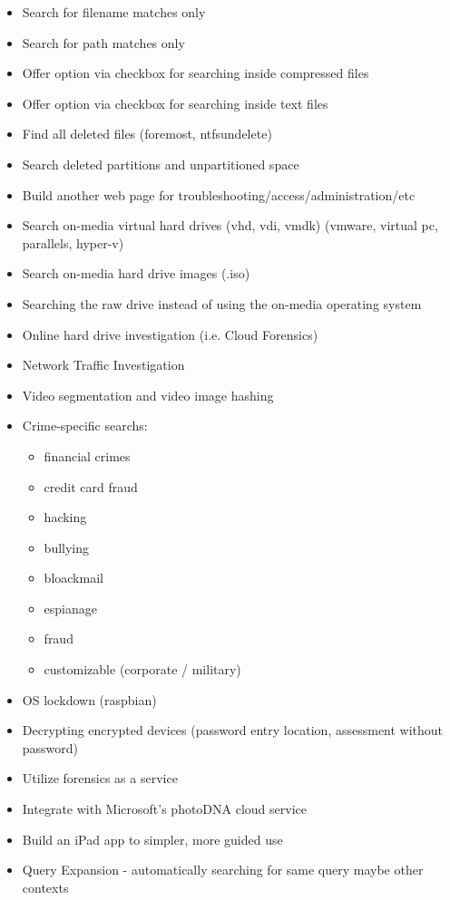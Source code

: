 \documentclass[12pt]{article}
\begin{document}
\begin{itemize}
  \item Search for filename matches only
  \item Search for path matches only
  \item Offer option via checkbox for searching inside compressed files
  \item Offer option via checkbox for searching inside text files
  \item Find all deleted files (foremost, ntfsundelete)
  \item Search deleted partitions and unpartitioned space
  \item Build another web page for troubleshooting/access/administration/etc
  \item Search on-media virtual hard drives (vhd, vdi, vmdk) (vmware, virtual pc, parallels, hyper-v)
  \item Search on-media hard drive images (.iso)
  \item Searching the raw drive instead of using the on-media operating system
  \item Online hard drive investigation (i.e. Cloud Forensics)
  \item Network Traffic Investigation
  \item Video segmentation and video image hashing
  \item Crime-specific searchs:
  \begin{itemize}
    \item financial crimes
    \item credit card fraud
    \item hacking
    \item bullying
    \item bloackmail
    \item espianage
    \item fraud
    \item customizable (corporate / military)
  \end{itemize}
  \item OS lockdown (raspbian)
  \item Decrypting encrypted devices (password entry location, assessment without password)
  \item Utilize forensics as a service
  \item Integrate with Microsoft's photoDNA cloud service
  \item Build an iPad app to simpler, more guided use
  \item Query Expansion - automatically searching for same query maybe other contexts

\end{itemize}
\end{document}
